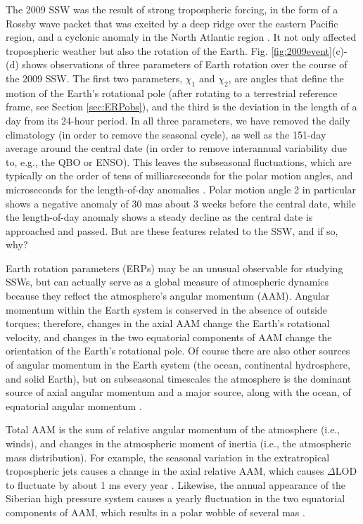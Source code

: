 \documentclass[draft,jgrga]{agutex}
\begin{document}
\begin{article}
The 2009 SSW was the result of strong tropospheric forcing, in the form of a Rossby wave packet that was excited by a deep ridge over the eastern Pacific region, and a cyclonic anomaly in the North Atlantic region \citep{ayarzaguenaetal2011}.
It not only affected  tropospheric weather but also the rotation of the Earth.
Fig. \ref{fig:2009event}(c)-(d) shows observations of three parameters of Earth rotation over the course of the 2009 SSW.  
The first two parameters, $\chi_1$ and $\chi_2$, are angles that define the motion of the Earth's rotational pole  {(after rotating to a terrestrial reference frame, see Section} \ref{sec:ERPobs}), and the third is the deviation in the length of a day from its 24-hour period.
 {In all three parameters, we have removed the daily climatology (in order to remove the seasonal cycle), as well as the 151-day average around the central date (in order to remove interannual variability due to, e.g., the QBO or ENSO).
This leaves the subseasonal fluctuations, which are typically on the order of tens of milliarcseconds for the polar motion angles, and microseconds for the length-of-day anomalies} \citep{salsteinrosen1989, eubanksetal1985,rosenetal1991}.  
 {Polar motion angle 2 in particular shows a negative anomaly of 30 mas about 3 weeks before the central date, while the length-of-day anomaly shows a steady decline as the central date is approached and passed.  
But are these features related to the SSW, and if so, why?}

Earth rotation parameters (ERPs) may be an unusual observable for studying SSWs, but can actually serve as a global measure of  atmospheric dynamics because they reflect the atmosphere's angular momentum (AAM).  
Angular momentum within the Earth system is conserved in the absence of outside torques; therefore, changes in the axial AAM   change the Earth's rotational velocity, and changes in the two equatorial components of AAM  {change} the orientation of the Earth's rotational pole.
Of course there are also other sources of angular momentum in the Earth system (the ocean, continental hydrosphere, and solid Earth), but on subseasonal timescales the atmosphere is the dominant source of axial angular momentum \citep{Rosen1983,eubanksetal1985} and a major source, along with the ocean, of equatorial angular momentum  \citep{dobslawetal2010}. 

Total AAM is the sum of relative angular momentum of the atmosphere (i.e., winds), and changes in the atmospheric moment of inertia (i.e., the atmospheric mass distribution).
For example, the seasonal variation in the extratropical tropospheric jets causes a change in the axial relative AAM, which causes $\Delta$LOD to fluctuate by about 1 ms every year \citep{hideetal1997}.
Likewise, the annual appearance of the Siberian high pressure system  {causes} a yearly fluctuation in the two equatorial components of AAM, which results in a polar wobble of several mas \citep{chao_au1991,nastulaetal2009,dobslawetal2010}.


\end{article}
\end{document}
